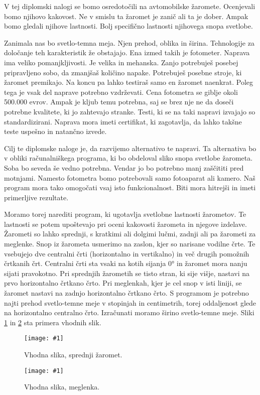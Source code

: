 \documentclass[oneside, a4paper, 12pt]{book}
\newcommand{\slika}[3]{
	\begin{figure}
	\begin{center}
	\texttt{[image: \#1]}
	\end{center}
	\vspace{-20pt}
	\caption{#2}
	\label{#3}
	\end{figure}
}
\begin{document}
V tej diplomski nalogi se bomo osredotočili na avtomobilske žaromete. Ocenjevali bomo njihovo kakovost. Ne v smislu ta žaromet je zanič ali ta je dober. Ampak bomo gledali njihove lastnosti. Bolj specifično lastnosti njihovega snopa svetlobe.

Zanimala nas bo svetlo-temna meja. Njen prehod, oblika in širina. Tehnologije za določanje teh karakteristik že obstajajo. Ena izmed takih je fotometer. Naprava ima veliko pomanjkljivosti. Je velika in mehanska. Zanjo potrebuješ posebej pripravljeno sobo, da zmanjšaš količino napake. Potrebuješ posebne stroje, ki žaromet premikajo. Na koncu pa lahko testiraš samo en žaromet naenkrat. Poleg tega je vsak del naprave potrebno vzdrževati. Cena fotometra se giblje okoli 500.000 evrov. Ampak je kljub temu potrebna, saj se brez nje ne da doseči potrebne kvalitete, ki jo zahtevajo stranke. Testi, ki se na taki napravi izvajajo so standardizirani. Naprava mora imeti certifikat, ki zagotavlja, da lahko takšne teste uspešno in natančno izvede.

Cilj te diplomske naloge je, da razvijemo alternativo te napravi. Ta alternativa bo v obliki računalniškega programa, ki bo obdeloval sliko snopa svetlobe žarometa. Soba bo seveda še vedno potrebna. Vendar jo bo potrebno manj zaščititi pred motnjami. Namesto fotometra bomo potrebovali samo fotoaparat ali kamero. Naš program mora tako omogočati vsaj isto funkcionalnost. Biti mora hitrejši in imeti primerljive rezultate.

Moramo torej narediti program, ki ugotavlja svetlobne lastnosti žarometov. Te lastnosti se potem upoštevajo pri oceni kakovosti žarometa in njegove izdelave. Žarometi so lahko sprednji, s kratkimi ali dolgimi lučmi, zadnji ali pa žarometi za meglenke. Snop iz žarometa usmerimo na zaslon, kjer so narisane vodilne črte. Te vsebujejo dve centralni črti (horizontalno in vertikalno) in več drugih pomožnih črtkanih črt. Centralni črti sta vsaki na kotih sijanja 0° in žaromet mora nanju sijati pravokotno. Pri sprednjih žarometih se tisto stran, ki sije višje, nastavi na prvo horizontalno črtkano črto. Pri meglenkah, kjer je cel snop v isti liniji, se žaromet nastavi na zadnjo horizontalno črtkano črto. S programom je potrebno najti prehod svetlo-temne meje v stopinjah in centimetrih, torej oddaljenost glede na horizontalno centralno črto. Izračunati moramo širino svetlo-temne meje. Sliki \ref{pic:vhp1} in \ref{pic:vhp2} sta primera vhodnih slik.

\slika{slike/original.jpg}{Vhodna slika, sprednji žaromet.}{pic:vhp1}
\slika{slike/levi3.JPG}{Vhodna slika, meglenka.}{pic:vhp2}
\end{document}
